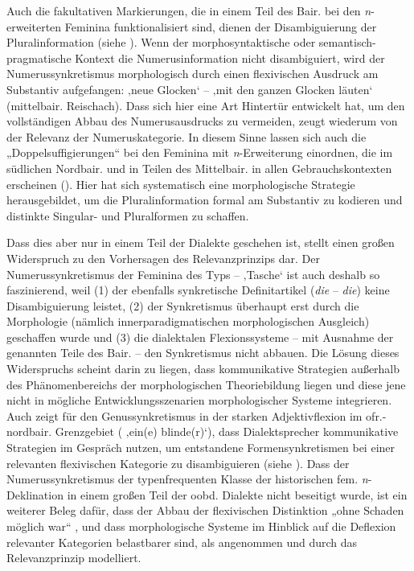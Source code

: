 Auch die fakultativen Markierungen, die in einem Teil des Bair. bei den \textit{n}{}-erweiterten Feminina funktionalisiert sind, dienen der Disambiguierung der Pluralinformation (siehe ). Wenn der morphosyntaktische oder se\-man\-tisch-prag\-ma\-ti\-sche Kontext die Numerusinformation nicht disambiguiert, wird der Numerussynkretismus morphologisch durch einen flexivischen Ausdruck am Substantiv aufgefangen:   ‚neue Glocken‘ --      ‚mit den ganzen Glocken läuten‘ (mittelbair. Reischach). Dass sich hier eine Art Hintertür entwickelt hat, um den vollständigen Abbau des Numerusausdrucks zu vermeiden, zeugt wiederum von der Relevanz der Numeruskategorie. In diesem Sinne lassen sich auch die „Doppelsuffigierungen“ bei den Feminina mit \textit{n}{}-Erweiterung einordnen, die im südlichen Nordbair. und in Teilen des Mittelbair. in allen Gebrauchskontexten erscheinen (). Hier hat sich systematisch eine morphologische Strategie herausgebildet, um die Pluralinformation formal am Substantiv zu kodieren und distinkte Singular- und Pluralformen zu schaffen.

Dass dies aber nur in einem Teil der Dialekte geschehen ist, stellt einen großen Widerspruch zu den Vorhersagen des Relevanzprinzips dar. Der Numerussynkretismus der Feminina des Typs  --  ‚Tasche‘ ist auch deshalb so faszinierend, weil (1) der ebenfalls synkretische Definitartikel (\textit{die} -- \textit{die}) keine Disambiguierung leistet, (2) der Synkretismus überhaupt erst durch die Morphologie (nämlich innerparadigmatischen morphologischen Ausgleich) geschaffen wurde und (3) die dialektalen Flexionssysteme -- mit Ausnahme der genannten Teile des Bair. -- den Synkretismus nicht abbauen. Die Lösung dieses Widerspruchs scheint darin zu liegen, dass kommunikative Strategien außerhalb des Phänomenbereichs der morphologischen Theoriebildung liegen und diese jene nicht in mögliche Entwicklungsszenarien morphologischer Systeme integrieren. Auch \citet{Harnisch1984} zeigt für den Genussynkretismus in der starken Adjektivflexion im ofr.-nordbair. Grenzgebiet (  ‚ein(e) blinde(r)‘), dass Dialektsprecher kommunikative Strategien im Gespräch nutzen, um entstandene Formensynkretismen bei einer relevanten flexivischen Kategorie zu disambiguieren (siehe ). Dass der Numerussynkretismus der typenfrequenten Klasse der historischen fem. \textit{n}{}-Deklination in einem großen Teil der oobd. Dialekte nicht beseitigt wurde, ist ein weiterer Beleg dafür, dass der Abbau der flexivischen Distinktion „ohne Schaden möglich war“ \citep[89]{Harnisch1984}, und dass morphologische Systeme im Hinblick auf die Deflexion relevanter Kategorien belastbarer sind, als angenommen und durch das Relevanzprinzip modelliert.


